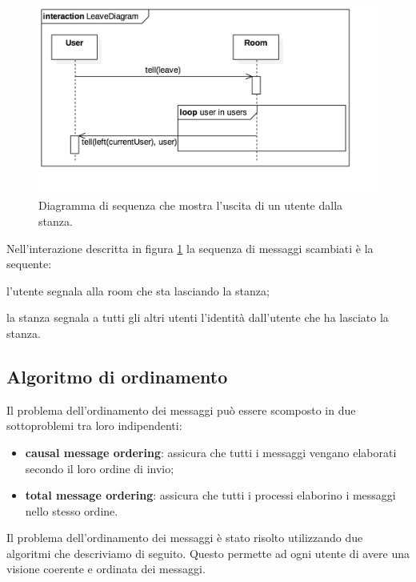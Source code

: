 \documentclass[a4paper]{report}
\begin{document}
\begin{figure}[H]
    \centering
    \includegraphics[width=\linewidth, height=\textheight, keepaspectratio]{res/LeaveDiagram}
        \caption{Diagramma di sequenza che mostra l'uscita di un utente dalla stanza.}
    \label{fig:leave-diagram}
\end{figure}

Nell'interazione descritta in figura \ref{fig:leave-diagram} la sequenza di messaggi scambiati è la sequente:
\begin{enumerate*}[label=(\arabic*)]
%
    \item l'utente segnala alla room che sta lasciando la stanza;
%
    \item la stanza segnala a tutti gli altri utenti l'identità dall'utente che ha lasciato la stanza.
%
\end{enumerate*}

\subsection{Algoritmo di ordinamento}\label{ordinamento-2}

Il problema dell'ordinamento dei messaggi può essere scomposto in due sottoproblemi tra loro indipendenti:

\begin{itemize}
%
    \item\textbf{causal message ordering}: assicura che tutti i messaggi vengano elaborati secondo il loro ordine di invio;
%
    \item\textbf{total message ordering}: assicura che tutti i processi elaborino i messaggi nello stesso ordine.
%
\end{itemize}

Il problema dell'ordinamento dei messaggi è stato risolto utilizzando due algoritmi che descriviamo di seguito. Questo permette ad ogni utente di avere una visione coerente e ordinata dei messaggi.
\end{document}
